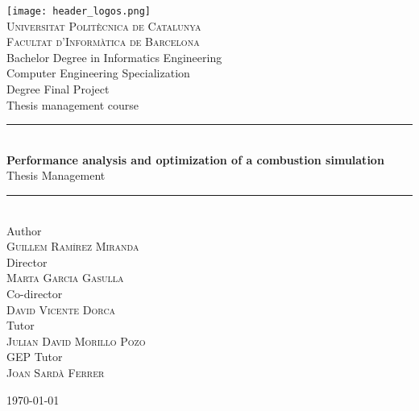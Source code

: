 \begin{titlepage}

  \newcommand{\HRule}{\rule{\linewidth}{0.5mm}}

  \begin{center}
    
    \texttt{[image: header\_logos.png]}\\[0.7cm]

    \textsc{\Large Universitat Politècnica de Catalunya}\\[0.1cm]
    \textsc{\large Facultat d'Informàtica de Barcelona}\\[0.4cm]
    {\large Bachelor Degree in Informatics Engineering}\\[0.1cm]
    {\large Computer Engineering Specialization}\\[0.1cm]
    {\large Degree Final Project}\\[0.1cm]
    {\large Thesis management course}\\[1cm]

    \HRule\\[0.4cm]

    {
      \LARGE\bfseries Performance analysis and optimization of a combustion simulation\\[0.2cm]
    }
    {\large Thesis Management}
    \\[0.4cm]\HRule\\[1cm]

    {\large Author}\\[0.1cm]
    \textsc{\large Guillem Ramírez Miranda}\\[0.4cm]
    {\large Director}\\[0.1cm]
    \textsc{\large Marta Garcia Gasulla}\\[0.4cm]
    {\large Co-director}\\[0.1cm]
    \textsc{\large David Vicente Dorca}\\[0.4cm]
    {\large Tutor}\\[0.1cm]
    \textsc{\large Julian David Morillo Pozo}\\[0.4cm]
    {\large GEP Tutor}\\[0.1cm]
    \textsc{\large Joan Sardà Ferrer}\\[0.1cm]
    \vfill
    {\large \today\par}

  \end{center}

\end{titlepage}
